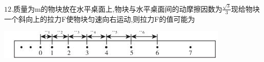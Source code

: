 \begin{solution}{4cm}

\end{solution}



\question[6]$12.$质量为m的物块放在水平桌面上,物块与水平桌面间的动摩擦因数为$\frac{\sqrt{3}}{3}$现给物块一个斜向上的拉力F使物块匀速向右运动,则拉力F的值可能为
\begin{center}
\includegraphics[]{img/image12.jpeg}
\end{center}

\begin{solution}{4cm}

\end{solution}



